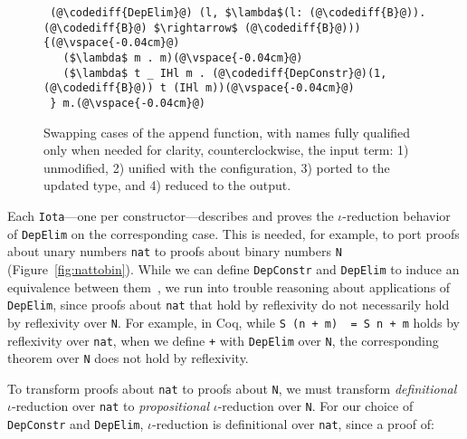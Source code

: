 \begin{figure*}
\begin{minipage}{0.49\textwidth}
\begin{lstlisting}
 (@\codediff{DepElim}@) (l, $\lambda$(l: (@\codediff{B}@)).(@\codediff{B}@) $\rightarrow$ (@\codediff{B}@))) {(@\vspace{-0.04cm}@)
   ($\lambda$ m . m)(@\vspace{-0.04cm}@)
   ($\lambda$ t _ IHl m . (@\codediff{DepConstr}@)(1, (@\codediff{B}@)) t (IHl m))(@\vspace{-0.04cm}@)
 } m.(@\vspace{-0.04cm}@)
\end{lstlisting}
\end{minipage}
\vspace{-0.4cm}
\caption{Swapping cases of the append function, with names fully qualified only when needed for clarity, counterclockwise, the input term: 1) unmodified, 2) unified with the configuration, 3) ported to the updated type, and 4) reduced to the output.}
\label{fig:appswap1}
\end{figure*}

Each \lstinline{Iota}---one per constructor---describes and proves the $\iota$-reduction behavior
of \lstinline{DepElim} on the corresponding case.
This is needed, for example, to port proofs about unary numbers \lstinline{nat} to
proofs about binary numbers \lstinline{N} (Figure~\ref{fig:nattobin}).
While we can define \lstinline{DepConstr} and \lstinline{DepElim} to induce an equivalence
between them~, %
we run into trouble reasoning about applications of \lstinline{DepElim},
since proofs about \lstinline{nat} that hold by reflexivity do not necessarily hold by reflexivity over \lstinline{N}. 
For example, in Coq, while \lstinline{S (n + m)  = S n + m} holds by reflexivity over \lstinline{nat},
when we define \lstinline{+} with \lstinline{DepElim} over \lstinline{N},
the corresponding theorem over \lstinline{N} does not hold by reflexivity.

To transform proofs about \lstinline{nat} to proofs about \lstinline{N}, we must transform \textit{definitional} $\iota$-reduction over \lstinline{nat} to \textit{propositional} $\iota$-reduction over \lstinline{N}.
For our choice of \lstinline{DepConstr} and \lstinline{DepElim},
$\iota$-reduction is definitional over \lstinline{nat}, since a proof of:\vspace{-0.01cm}

